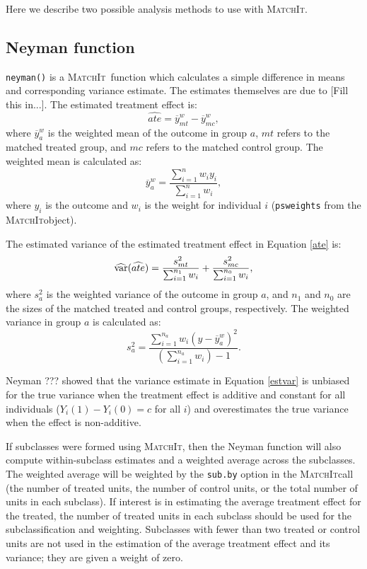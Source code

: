 \documentclass[oneside,letterpaper,titlepage]{article}
\newcommand{\MatchIt}{\textsc{MatchIt}}
\begin{document}
Here we describe two possible analysis methods to use with \MatchIt.    

\subsection{Neyman function}

{\tt neyman()} is a \MatchIt\ function which
calculates a simple difference in means and corresponding variance estimate.  The estimates themselves are due
to \cite{Neyman??} [Fill this in...].  The estimated treatment effect is:
\begin{equation}
\label{ate} 
\widehat{ate} = \overline{y}_{mt}^w-\overline{y}_{mc}^w,
\end{equation}
where $\overline{y}_a^w$ is the weighted mean of the outcome in group $a$, $mt$ refers to the matched treated group, and $mc$
refers to the matched control group.  The weighted mean is calculated as:
$$ \overline{y}_a^w = \frac{\sum_{i=1}^n w_i y_i}{\sum_{i=1}^n w_i},$$
where $y_i$ is the outcome and $w_i$ is the weight for individual $i$ ({\tt psweights} from the \MatchIt object).

The estimated variance of the estimated treatment effect in Equation \eqref{ate} is:
\begin{equation}
\label{estvar}
\widehat{{\rm var}}(\widehat{ate}) = \frac{s_{mt}^2}{\sum_{i=1}^{n_1} w_i} + \frac{s_{mc}^2}{\sum_{i=1}^{n_0} w_i},
\end{equation}
where $s_a^2$ is the weighted variance of the outcome in group $a$,
and $n_1$ and $n_0$ are the sizes of the matched treated and control
groups, respectively.  The weighted variance in group $a$ is
calculated as:
$$ s^2_{a} = \frac{\sum_{i=1}^{n_a} w_i (y-\overline{y}_a^w)^2}{(\sum_{i=1}^{n_a} w_i) - 1}.$$

Neyman ??? showed that the variance estimate in Equation
\eqref{estvar} is unbiased for the true variance when the treatment
effect is additive and constant for all individuals ($Y_i(1)-Y_i(0)=c$
for all $i$) and overestimates the true variance when the effect is
non-additive.

If subclasses were formed using \MatchIt, then the Neyman function
will also compute within-subclass estimates and a weighted average
across the subclasses.  The weighted average will be weighted by the
{\tt sub.by} option in the \MatchIt call (the number of treated units,
the number of control units, or the total number of units in each
subclass).  If interest is in estimating the average treatment effect
for the treated, the number of treated units in each subclass should
be used for the subclassification and weighting.  Subclasses with
fewer than two treated or control units are not used in the estimation
of the average treatment effect and its variance; they are given a
weight of zero.
\end{document}
